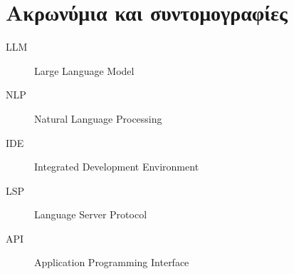 \chapter{Ακρωνύμια και συντομογραφίες}

\begin{description}
  \item[LLM] Large Language Model
  \item[NLP] Natural Language Processing
  \item[IDE] Integrated Development Environment
  \item[LSP] Language Server Protocol
  \item[API] Application Programming Interface
\end{description}
